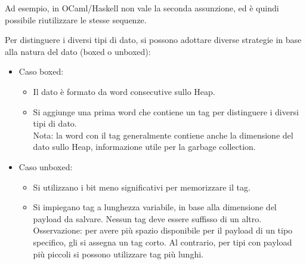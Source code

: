 \documentclass{article}
\begin{document}
Ad esempio, in OCaml/Haskell non vale la seconda assunzione, ed è quindi possibile riutilizzare le stesse sequenze.

Per distinguere i diversi tipi di dato, si possono adottare diverse strategie in base alla natura del dato (boxed o unboxed):
\begin{itemize}
    \item Caso boxed:
    \begin{itemize}
        \item Il dato è formato da word consecutive sullo Heap.
        \item Si aggiunge una prima word che contiene un tag per distinguere i diversi tipi di dato.\vspace{10pt}\\
        Nota: la word con il tag generalmente contiene anche la dimensione del dato sullo Heap, informazione utile per la garbage collection.
    \end{itemize}
    \item Caso unboxed:
    \begin{itemize}
        \item Si utilizzano i bit meno significativi per memorizzare il tag.
        \item Si impiegano tag a lunghezza variabile, in base alla dimensione del payload da salvare. Nessun tag deve essere suffisso di un altro.\vspace{10pt}\\
        Osservazione: per avere più spazio disponibile per il payload di un tipo specifico, gli si assegna un tag corto. Al contrario, per tipi con payload più piccoli si possono utilizzare tag più lunghi.
    \end{itemize}
\end{itemize}
\end{document}
